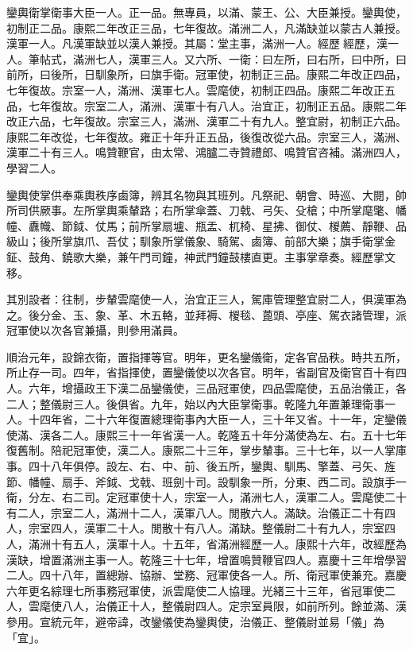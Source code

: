 \begin{pinyinscope}
鑾輿衛掌衛事大臣一人。正一品。無專員，以滿、蒙王、公、大臣兼授。鑾輿使，初制正二品。康熙二年改正三品，七年復故。滿洲二人，凡滿缺並以蒙古人兼授。漢軍一人。凡漢軍缺並以漢人兼授。其屬：堂主事，滿洲一人。經歷經歷，漢一人。筆帖式，滿洲七人，漢軍三人。又六所、一衛：曰左所，曰右所，曰中所，曰前所，曰後所，日馴象所，曰旗手衛。冠軍使，初制正三品。康熙二年改正四品，七年復故。宗室一人，滿洲、漢軍七人。雲麾使，初制正四品。康熙二年改正五品，七年復故。宗室二人，滿洲、漢軍十有八人。治宜正，初制正五品。康熙二年改正六品，七年復故。宗室三人，滿洲、漢軍二十有九人。整宜尉，初制正六品。康熙二年改從，七年復故。雍正十年升正五品，後復改從六品。宗室三人，滿洲、漢軍二十有三人。鳴贊鞭官，由太常、鴻臚二寺贊禮郎、鳴贊官咨補。滿洲四人，學習二人。

鑾輿使掌供奉乘輿秩序鹵簿，辨其名物與其班列。凡祭祀、朝會、時巡、大閱，帥所司供厥事。左所掌輿乘輦路；右所掌傘蓋、刀戟、弓矢、殳槍；中所掌麾氅、幡幢、纛幟、節鉞、仗馬；前所掌扇壚、瓶盂、杌椅、星拂、御仗、椶薦、靜鞭、品級山；後所掌旗爪、吾仗；馴象所掌儀象、騎駕、鹵簿、前部大樂；旗手衛掌金鉦、鼓角、鐃歌大樂，兼午門司鐘，神武門鐘鼓樓直更。主事掌章奏。經歷掌文移。

其別設者：往制，步輦雲麾使一人，治宜正三人，駕庫管理整宜尉二人，俱漢軍為之。後分金、玉、象、革、木五輅，並拜褥、椶毯、蓖頭、亭座、駕衣諸管理，派冠軍使以次各官兼攝，則參用滿員。

順治元年，設錦衣衛，置指揮等官。明年，更名鑾儀衛，定各官品秩。時共五所，所止存一司。四年，省指揮使，置鑾儀使以次各官。明年，省副官及衛官百十有四人。六年，增攝政王下漢二品鑾儀使，三品冠軍使，四品雲麾使，五品治儀正，各二人；整儀尉三人。後俱省。九年，始以內大臣掌衛事。乾隆九年置兼理衛事一人。十四年省，二十六年復置總理衛事內大臣一人，三十年又省。十一年，定鑾儀使滿、漢各二人。康熙三十一年省漢一人。乾隆五十年分滿使為左、右。五十七年復舊制。陪祀冠軍使，漢二人。康熙二十三年，掌步輦事。三十七年，以一人掌庫事。四十八年俱停。設左、右、中、前、後五所，鑾輿、馴馬、擎蓋、弓矢、旌節、幡幢、扇手、斧鉞、戈戟、班劍十司。設馴象一所，分東、西二司。設旗手一衛，分左、右二司。定冠軍使十人，宗室一人，滿洲七人，漢軍二人。雲麾使二十有二人，宗室二人，滿洲十二人，漢軍八人。閒散六人。滿缺。治儀正二十有四人，宗室四人，漢軍二十人。閒散十有八人。滿缺。整儀尉二十有九人，宗室四人，滿洲十有五人，漢軍十人。十五年，省滿洲經歷一人。康熙十六年，改經歷為漢缺，增置滿洲主事一人。乾隆三十七年，增置鳴贊鞭官四人。嘉慶十三年增學習二人。四十八年，置總辦、協辦、堂務、冠軍使各一人。所、衛冠軍使兼充。嘉慶六年更名綜理七所事務冠軍使，派雲麾使二人協理。光緒三十三年，省冠軍使二人，雲麾使八人，治儀正十人，整儀尉四人。定宗室員限，如前所列。餘並滿、漢參用。宣統元年，避帝諱，改鑾儀使為鑾輿使，治儀正、整儀尉並易「儀」為「宜」。


\end{pinyinscope}
